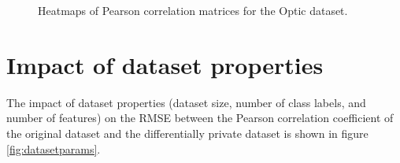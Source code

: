 \begin{figure}[H]
    \centering
    \qquad
    \qquad
    \caption{Heatmaps of Pearson correlation matrices for the Optic dataset.}
    \label{fig:heatmapsoptic}
\end{figure}

\section{Impact of dataset properties}
The impact of dataset properties (dataset size, number of class labels, and number of features) on the RMSE between the Pearson correlation coefficient of the original dataset and the differentially private dataset is shown in figure \ref{fig:datasetparams}.

